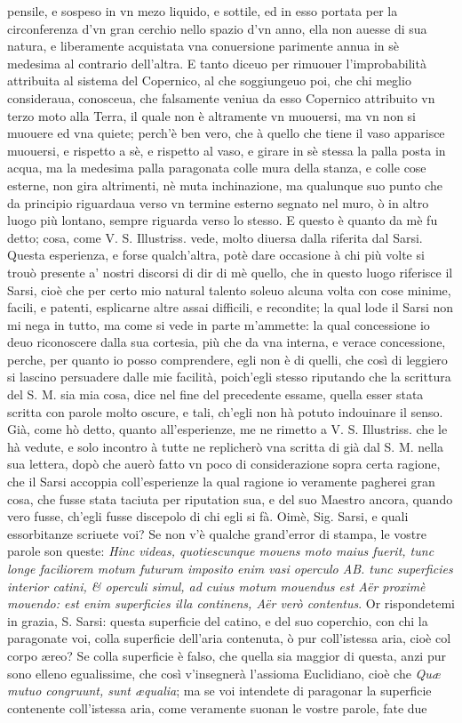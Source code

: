 \documentclass[11pt,twoside,openany]{book}
\begin{document}
pensile, e sospeso in vn mezo liquido, e sottile, ed in esso portata per la circonferenza d'vn gran cerchio nello spazio d'vn anno, ella non auesse di sua natura, e liberamente acquistata vna conuersione parimente annua in sè medesima al contrario dell'altra. E tanto diceuo per rimuouer l'improbabilità attribuita al sistema del Copernico, al che soggiungeuo poi, che chi meglio consideraua, conosceua, che falsamente veniua da esso Copernico attribuito vn terzo moto alla Terra, il quale non è altramente vn muouersi, ma vn non si muouere ed vna quiete; perch'è ben vero, che à quello che tiene il vaso apparisce muouersi, e rispetto a sè, e rispetto al vaso, e girare in sè stessa la palla posta in acqua, ma la medesima palla paragonata colle mura della stanza, e colle cose esterne, non gira altrimenti, nè muta inchinazione, ma qualunque suo punto che da principio riguardaua verso vn termine esterno segnato nel muro, ò in altro luogo più lontano, sempre riguarda verso lo stesso. E questo è quanto da mè fu detto; cosa, come V. S. Illustriss. vede, molto diuersa dalla riferita dal Sarsi. Questa esperienza, e forse qualch'altra, potè dare occasione à chi più volte si trouò presente a' nostri discorsi di dir di mè quello, che in questo luogo riferisce il Sarsi, cioè che per certo mio natural talento soleuo alcuna volta con cose minime, facili, e patenti, esplicarne altre assai difficili, e recondite; la qual lode il Sarsi non mi nega in tutto, ma come si vede in parte m'ammette: la qual concessione io deuo riconoscere dalla sua cortesia, più che da vna interna, e verace concessione, perche, per quanto io posso comprendere, egli non è di quelli, che così di leggiero si lascino persuadere dalle mie facilità, poich'egli stesso riputando che la scrittura del S. M. sia mia cosa, dice nel fine del precedente essame, quella esser stata scritta con parole molto oscure, e tali, ch'egli non hà potuto indouinare il senso. Già, come hò detto, quanto all'esperienze, me ne rimetto a V. S. Illustriss. che le hà vedute, e solo incontro à tutte ne replicherò vna scritta di già dal S. M. nella sua lettera, dopò che auerò fatto vn poco di considerazione sopra certa ragione, che il Sarsi accoppia coll'esperienze la qual ragione io veramente pagherei gran cosa, che fusse stata taciuta per riputation sua, e del suo Maestro ancora, quando vero fusse, ch'egli fusse discepolo di chi egli si fà. Oimè, Sig. Sarsi, e quali essorbitanze scriuete voi? Se non v'è qualche grand'error di stampa, le vostre parole son queste: \textit{Hinc videas, quotiescunque mouens moto maius fuerit, tunc longe faciliorem motum futurum imposito enim vasi operculo AB. tunc superficies interior catini, \& operculi simul, ad cuius motum mouendus est Aër proximè mouendo: est enim superficies illa continens, Aër verò contentus}. Or rispondetemi in grazia, S. Sarsi: questa superficie del catino, e del suo coperchio, con chi la paragonate voi, colla superficie dell'aria contenuta, ò pur coll'istessa aria, cioè col corpo æreo? Se colla superficie è falso, che quella sia maggior di questa, anzi pur sono elleno egualissime, che così v'insegnerà l'assioma Euclidiano, cioè che \textit{Quæ mutuo congruunt, sunt æqualia}; ma se voi intendete di paragonar la superficie contenente coll'istessa aria, come veramente suonan le vostre parole, fate due 
\end{document}
